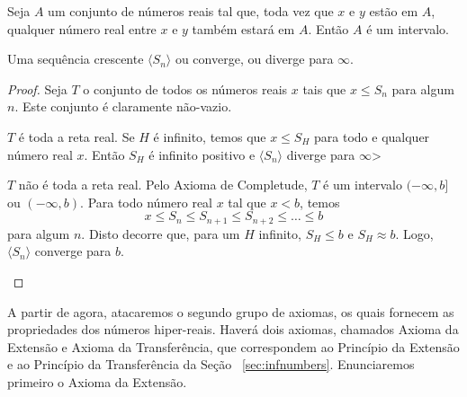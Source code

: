 \documentclass{svmono}
\begin{document}

Seja $A$ um conjunto de números reais tal que, toda vez que $x$ e $y$
estão em $A$, qualquer número real entre $x$ e $y$ também estará em $A$.
Então $A$ é um intervalo.

\begin{theor}
Uma sequência crescente $\langle S_n \rangle$ ou converge, ou diverge para
$\infty$.
\end{theor}

\begin{proof}
Seja $T$ o conjunto de todos os números reais $x$ tais que $x \le S_n$ para
algum $n$. Este conjunto é claramente não-vazio.

\begin{case}$T$ é toda a reta real. Se $H$ é infinito, temos que $x \le S_H$
para todo e qualquer número real $x$. Então $S_H$ é infinito positivo e
$\langle S_n \rangle$ diverge para $\infty$>
\end{case}

\begin{case}$T$ não é toda a reta real. Pelo Axioma de Completude,
$T$ é um intervalo $(-\infty,b]$ ou $(-\infty,b)$. Para todo número
real $x$ tal que $x < b$, temos
\[
	x \le S_n \le S_{n+1} \le S_{n+2} \le \ldots \le b
\]
para algum $n$. Disto decorre que, para um $H$ infinito, $S_H \le b$ e
$S_H \approx b$. Logo, $\langle S_n \rangle$ converge para $b$.
\end{case}%
\end{proof}

A partir de agora, atacaremos o segundo grupo de axiomas, os quais
fornecem as propriedades dos números hiper-reais. Haverá dois axiomas,
chamados Axioma da Extensão e Axioma da Transferência, que correspondem
ao Princípio da Extensão e ao Princípio da Transferência da Seção%
~\ref{sec:infnumbers}. Enunciaremos primeiro o Axioma da Extensão.

\end{document}
